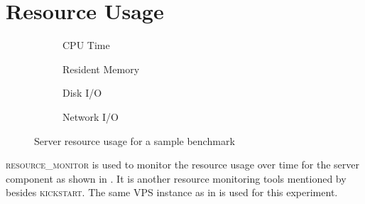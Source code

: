 \section{Resource Usage}
\label{sec:eval.resource}

\begin{figure}
	\centering

	\begin{subfigure}{.45\textwidth}
		\centering
		\caption{CPU Time}
		\label{fig:eval.perf.cpu}
	\end{subfigure}%
	\hfill%
	\begin{subfigure}{.45\textwidth}
		\centering
		\caption{Resident Memory}
		\label{fig:eval.perf.rss}
	\end{subfigure}

	\vspace{1cm}

	\begin{subfigure}{.45\textwidth}
		\centering
		\caption{Disk I/O}
		\label{fig:eval.perf.disk}
	\end{subfigure}%
	\hfill%
	\begin{subfigure}{.45\textwidth}
		\centering
		\caption{Network I/O}
		\label{fig:eval.perf.network}
	\end{subfigure}

	\caption{Server resource usage for a sample benchmark}
	\label{fig:eval.perf}
\end{figure}

\textsc{resource\_monitor} is used to monitor the resource usage over time for the server component as shown in .
It is another resource monitoring tools mentioned by \citet{juvePracticalResourceMonitoring2015} besides \textsc{kickstart}.
The same VPS instance as in  is used for this experiment.


